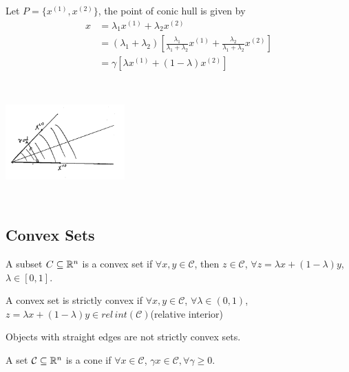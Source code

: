 \begin{example}
Let $P = \{x^{(1)}, x^{(2)} \}$, the point of conic hull is given by 
\begin{align*}
x 
&= \lambda_1x^{(1)} + \lambda_2x^{(2)}\\
&= ( \lambda_1 + \lambda_2)[\frac{\lambda_1}{\lambda_1 + \lambda_2}x^{(1)} + \frac{\lambda_2}{\lambda_1 + \lambda_2}x^{(2)}]\\
&= \gamma[\lambda x^{(1)} + (1-\lambda)x^{(2)}]
\end{align*}

\begin{marginfigure}
	\centering
	\includegraphics[width=1.8in,height=1.8in]{figures/ch08/figure1023_4.png}
\end{marginfigure}

\end{example}


\subsection{Convex Sets}

\begin{definition}
	A subset $C\subseteq \mathbb{R}^n$ is a convex set if $\forall x,y \in \mathcal{C}$, then $z\in \mathcal{C}$, $\forall z = \lambda x + (1-\lambda)y$, $\lambda \in [0,1].$
\end{definition}


\begin{definition}
	A convex set is strictly convex if $\forall x,y \in \mathcal{C}$, $\forall \lambda \in (0,1)$, $z = \lambda x + (1-\lambda)y \in rel\,int(\mathcal{C})$(relative interior)
\end{definition}

Objects with straight edges are not strictly convex sets.

\begin{definition}[Cone]
	A set $\mathcal{C}\subseteq \mathbb{R}^n $ is a cone if $\forall x\in \mathcal{C}$, $\gamma x\in \mathcal{C}, \forall \gamma \geq 0$.
\end{definition}


